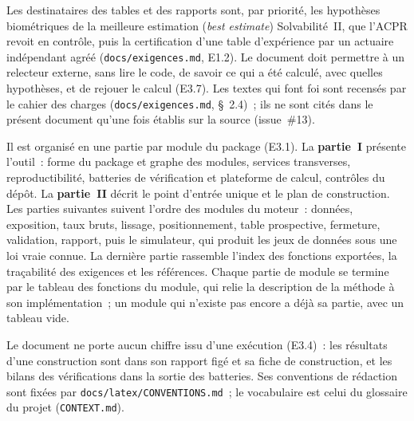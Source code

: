 \documentclass[a4paper,11pt]{article}
\newcommand{\code}[1]{\texttt{\small #1}}
\begin{document}
\medskip\noindent
Les destinataires des tables et des rapports sont, par priorité, les
hypothèses biométriques de la meilleure estimation (\emph{best estimate})
Solvabilité~II, que l'ACPR revoit en contrôle, puis la certification d'une
table d'expérience par un actuaire indépendant agréé (\code{docs/exigences.md},
E1.2). Le document doit permettre à un relecteur externe, sans lire le code,
de savoir ce qui a été calculé, avec quelles hypothèses, et de rejouer le
calcul (E3.7). Les textes qui font foi sont recensés par le cahier des charges
(\code{docs/exigences.md}, §~2.4)~; ils ne sont cités dans le présent document
qu'une fois établis sur la source (issue~\#13).

\medskip\noindent
Il est organisé en une partie par module du package (E3.1). La
\textbf{partie~I} présente l'outil~: forme du package et graphe des modules,
services transverses, reproductibilité, batteries de vérification et
plateforme de calcul, contrôles du dépôt. La \textbf{partie~II} décrit le point
d'entrée unique et le plan de construction. Les parties suivantes suivent
l'ordre des modules du moteur~: données, exposition, taux bruts, lissage,
positionnement, table prospective, fermeture, validation, rapport, puis le
simulateur, qui produit les jeux de données sous une loi vraie connue. La
dernière partie rassemble l'index des fonctions exportées, la traçabilité des
exigences et les références. Chaque partie de module se termine par le
tableau des fonctions du module, qui relie la description de la méthode à
son implémentation~; un module qui n'existe pas encore a déjà sa partie, avec
un tableau vide.

\medskip\noindent
Le document ne porte aucun chiffre issu d'une exécution (E3.4)~: les
résultats d'une construction sont dans son rapport figé et sa fiche de
construction, et les bilans des vérifications dans la sortie des batteries.
Ses conventions de rédaction sont fixées par \code{docs/latex/CONVENTIONS.md}~;
le vocabulaire est celui du glossaire du projet (\code{CONTEXT.md}).
\end{document}
